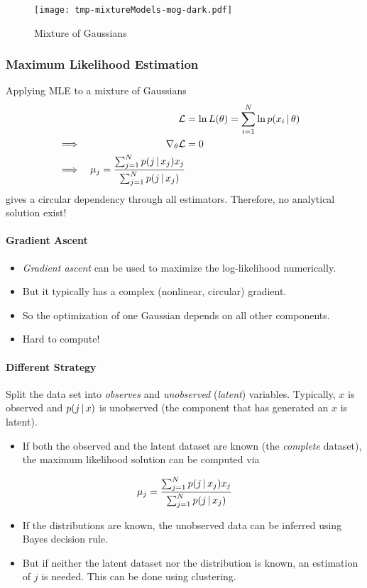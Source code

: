 			\begin{figure}
				\centering
				\texttt{[image: tmp-mixtureModels-mog-dark.pdf]}
				\caption{Mixture of Gaussians}
				\label{fig:mog}
			\end{figure}

			\subsubsection{Maximum Likelihood Estimation}
				Applying MLE to a mixture of Gaussians
				\begin{align}
					&& \mathcal{L} &= \ln L(\theta) = \sum_{i = 1}^{N} \ln p(x_i \,\vert\, \theta) & \\
					\implies && \nabla_\theta \mathcal{L} &= 0 & \\
					\implies && \mu_j = \frac{\sum_{j = 1}^{N} p(j \,\vert\, x_j) x_j}{\sum_{j = 1}^{N} p(j \,\vert\, x_j)}
				\end{align}
				gives a circular dependency through all estimators. Therefore, no analytical solution exist!

				\paragraph{Gradient Ascent}
					\begin{itemize}
						\item \emph{Gradient ascent} can be used to maximize the log-likelihood numerically.
						\item But it typically has a complex (nonlinear, circular) gradient.
						\item So the optimization of one Gaussian depends on all other components.
						\item Hard to compute!
					\end{itemize}

				\paragraph{Different Strategy}
					Split the data set into \emph{observes} and \emph{unobserved} (\emph{latent}) variables. Typically, \(x\) is observed and \(p(j \,\vert\, x)\) is unobserved (the component that has generated an \(x\) is latent).

					\begin{itemize}
						\item If both the observed and the latent dataset are known (the \emph{complete} dataset), the maximum likelihood solution can be computed via
					\end{itemize}
					\begin{equation}
						\mu_j = \frac{\sum_{j = 1}^{N} p(j \,\vert\, x_j) x_j}{\sum_{j = 1}^{N} p(j \,\vert\, x_j)}
					\end{equation}
					\begin{itemize}
						\item If the distributions are known, the unobserved data can be inferred using Bayes decision rule.
						\item But if neither the latent dataset nor the distribution is known, an estimation of \(j\) is needed. This can be done using clustering.
					\end{itemize}

